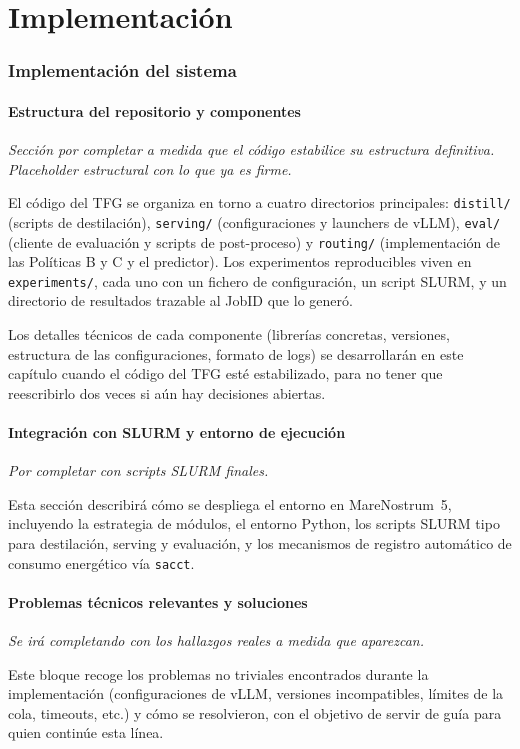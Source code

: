 \part{Implementación}
\label{part:implementacion}

\section{Implementación del sistema}
\label{sec:implementacion-sistema}

\subsection{Estructura del repositorio y componentes}

\textit{Sección por completar a medida que el código estabilice su estructura definitiva. Placeholder estructural con lo que ya es firme.}

El código del TFG se organiza en torno a cuatro directorios principales: \texttt{distill/} (scripts de destilación), \texttt{serving/} (configuraciones y launchers de vLLM), \texttt{eval/} (cliente de evaluación y scripts de post-proceso) y \texttt{routing/} (implementación de las Políticas B y C y el predictor). Los experimentos reproducibles viven en \texttt{experiments/}, cada uno con un fichero de configuración, un script SLURM, y un directorio de resultados trazable al JobID que lo generó.

Los detalles técnicos de cada componente (librerías concretas, versiones, estructura de las configuraciones, formato de logs) se desarrollarán en este capítulo cuando el código del TFG esté estabilizado, para no tener que reescribirlo dos veces si aún hay decisiones abiertas.

\subsection{Integración con SLURM y entorno de ejecución}

\textit{Por completar con scripts SLURM finales.}

Esta sección describirá cómo se despliega el entorno en MareNostrum~5, incluyendo la estrategia de módulos, el entorno Python, los scripts SLURM tipo para destilación, serving y evaluación, y los mecanismos de registro automático de consumo energético vía \texttt{sacct}.

\subsection{Problemas técnicos relevantes y soluciones}

\textit{Se irá completando con los hallazgos reales a medida que aparezcan.}

Este bloque recoge los problemas no triviales encontrados durante la implementación (configuraciones de vLLM, versiones incompatibles, límites de la cola, timeouts, etc.) y cómo se resolvieron, con el objetivo de servir de guía para quien continúe esta línea.

